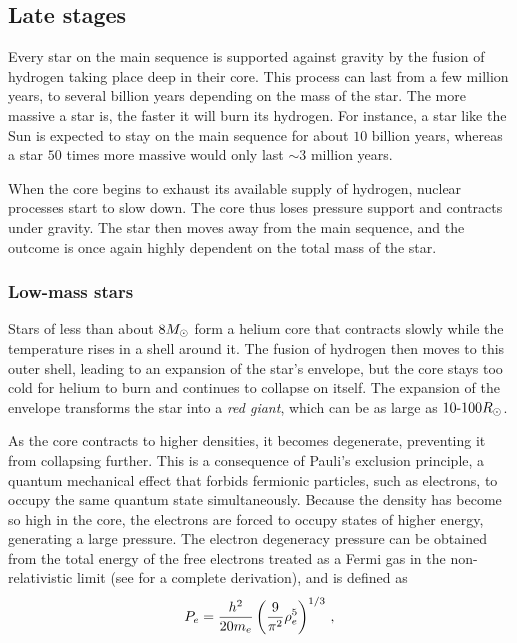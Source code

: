 \subsection{Late stages} \label{sec:star_late}

Every star on the main sequence is supported against gravity by the fusion of hydrogen taking place deep in their core. This process can last from a few million years, to several billion years depending on the mass of the star. The more massive a star is, the faster it will burn its hydrogen. For instance, a star like the Sun is expected to stay on the main sequence for about \(10\) billion years, whereas a star \(50\) times more massive would only last \(\sim3\) million years.

When the core begins to exhaust its available supply of hydrogen, nuclear processes start to slow down. The core thus loses pressure support and contracts under gravity. The star then moves away from the main sequence, and the outcome is once again highly dependent on the total mass of the star.

\subsubsection{Low-mass stars} \label{sec:star_late_lowmass}

Stars of less than about \(8M_{\odot}\) form a helium core that contracts slowly while the temperature rises in a shell around it. The fusion of hydrogen then moves to this outer shell, leading to an expansion of the star's envelope, but the core stays too cold for helium to burn and continues to collapse on itself. The expansion of the envelope transforms the star into a \emph{red giant}, which can be as large as \(10\text{-}100R_{\odot}\).

As the core contracts to higher densities, it becomes degenerate, preventing it from collapsing further. This is a consequence of Pauli's exclusion principle, a quantum mechanical effect that forbids fermionic particles, such as electrons, to occupy the same quantum state simultaneously. Because the density has become so high in the core, the electrons are forced to occupy states of higher energy, generating a large pressure. The electron degeneracy pressure can be obtained from the total energy of the free electrons treated as a Fermi gas in the non-relativistic limit (see \citealt{Longair2011} for a complete derivation), and is defined as
\begin{equation}
    P_e = \frac{h^2}{20 m_e} \left( \frac{9}{\pi^2} \rho_e^5 \right)^{1/3} \,\mathrm{,}
\end{equation}

